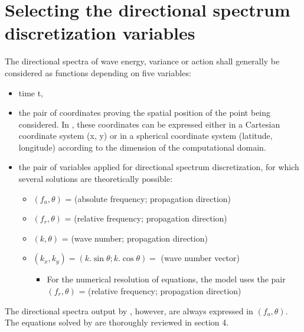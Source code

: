 \section{ Selecting the directional spectrum discretization variables}
\label{se:selecting}
 The directional spectra of wave energy, variance or action shall generally be considered as functions depending on five variables:
\begin{itemize}
 \item time t,

 \item the pair of coordinates proving the spatial position of the point being considered. In \tomawac, these coordinates can be expressed either in a Cartesian coordinate system (x, y) or in a spherical coordinate system (latitude, longitude) according to the dimension of the computational domain.

 \item the pair of variables applied for directional spectrum discretization, for which several solutions are theoretically possible:
\begin{itemize}

    \item$(f_a,\theta)$ = (absolute frequency; propagation direction)

    \item$(f_r,\theta)$ = (relative frequency; propagation direction)

    \item$(k,\theta)$ = (wave number; propagation direction)

    \item$(k_x,k_y) = (k.\sin \theta ; k.\cos \theta) =$ (wave number vector)

 \begin{itemize}
\item For the numerical resolution of equations, the model \tomawac uses the pair $(f_r,\theta)$ = (relative frequency; propagation direction)
\end{itemize}
\end{itemize}
\end{itemize}

 The directional spectra output by \tomawac, however, are always expressed in $(f_a,\theta)$. The equations solved by \tomawac are thoroughly reviewed in section 4.

